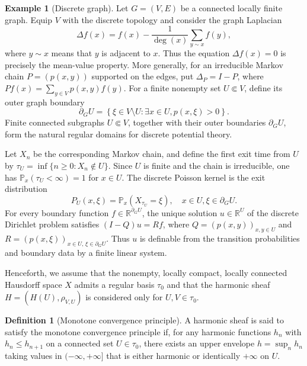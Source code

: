 \documentclass{amsart}
\theoremstyle{definition}
\newtheorem{definition}{Definition}[section]
\newtheorem{example}{Example}[section]
\theoremstyle{remark}
\numberwithin{equation}{section}
\begin{document}
	
	
	\begin{example}[Discrete graph]\label{example: discrete graph}
		Let $G=(V,E)$ be a connected locally finite graph. Equip $V$ with the discrete topology and consider the graph Laplacian
		$$\Delta f(x)=f(x)-\frac{1}{\deg(x)}\sum_{y\sim x}f(y),$$
		where $y\sim x$ means that $y$ is adjacent to $x$. Thus the equation $\Delta f(x)=0$ is precisely the mean-value property. More generally, for an irreducible Markov chain $P=(p(x,y))$ supported on the edges, put $\Delta_P=I-P$, where $Pf(x)=\sum_{y\in V}p(x,y)f(y)$. For a finite nonempty set $U\Subset V$, define its outer graph
		boundary $$\partial_G U=\left\{
		\xi\in V\setminus U:
		\exists x\in U, p(x,\xi)>0
		\right\}.$$ Finite connected subgraphs $U\Subset V$, together with their outer boundaries $\partial_GU$, form the natural regular domains for discrete potential theory.
		
		Let $X_n$ be the corresponding Markov chain, and define the first exit time from $U$ by $\tau_U=\inf\{n\ge0:X_n\notin U\}.$ Since $U$ is finite and the chain is irreducible, one has
		$\mathbb P_x(\tau_U<\infty)=1$ for $x\in U$.
		The discrete Poisson kernel is the exit distribution
		$$P_U(x,\xi)
		=
		\mathbb P_x(X_{\tau_U}=\xi),
		\quad
		x\in U,\xi\in\partial_GU.$$ For every boundary function
		$f\in\mathbb R^{\partial_GU}$, the unique solution $u\in\mathbb R^U$ of the discrete Dirichlet problem satisfies $(I-Q)u=Rf$, where $Q=(p(x,y))_{x,y\in U}$ and $R=(p(x,\xi))_{x\in U,\,\xi\in\partial_GU}$. Thus $u$ is definable from the transition probabilities and boundary data by a finite linear system.
	\end{example}
	
	Henceforth, we assume that the nonempty, locally compact, locally connected Hausdorff space $X$ admits a regular basis $\tau_0$ and that the harmonic sheaf $H=(H(U),\rho_{V,U})$ is considered only for $U,V\in\tau_0$. %
	
	\begin{definition}[Monotone convergence principle]
		A harmonic sheaf is said to satisfy the monotone convergence principle if, for any harmonic functions $h_n$ with $h_n\le h_{n+1}$ on a connected set $U\in\tau_0$, there exists an upper envelope $h= %
		\sup_n h_n$ taking values in $(-\infty,+\infty]$ that is either harmonic or identically $+\infty$ on $U$.
	\end{definition} 
	
\end{document}
